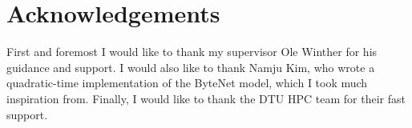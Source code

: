 \chapter{Acknowledgements}
First and foremost I would like to thank my supervisor Ole Winther for his guidance and support. I would also like to thank Namju Kim, who wrote a quadratic-time implementation of the ByteNet model, which I took much inspiration from. Finally, I would like to thank the DTU HPC team for their fast support.